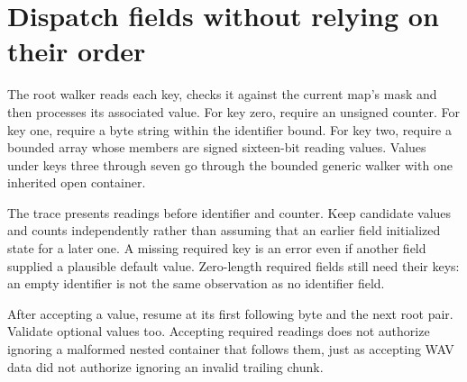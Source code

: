 \section{Dispatch fields without relying on their order}
The root walker reads each key, checks it against the current map's mask and then
processes its associated value. For key zero, require an unsigned counter. For key one,
require a byte string within the identifier bound. For key two, require a bounded array
whose members are signed sixteen-bit reading values. Values under keys three through
seven go through the bounded generic walker with one inherited open container.

The trace presents readings before identifier and counter. Keep candidate values and
counts independently rather than assuming that an earlier field initialized state for
a later one. A missing required key is an error even if another field supplied a
plausible default value. Zero-length required fields still need their keys: an empty
identifier is not the same observation as no identifier field.

After accepting a value, resume at its first following byte and the next root pair.
Validate optional values too. Accepting required readings does not authorize ignoring
a malformed nested container that follows them, just as accepting WAV data did not
authorize ignoring an invalid trailing chunk.
